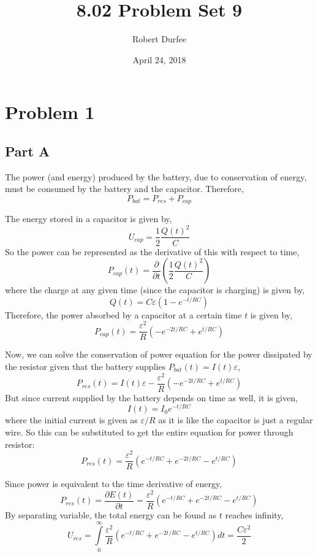 \documentclass{article}
\title{8.02 Problem Set 9}
\author{Robert Durfee}
\date{April 24, 2018}
\begin{document}
\maketitle

\section{Problem 1}

\subsection*{Part A}

The power (and energy) produced by the battery, due to conservation of energy,
must be consumed by the battery and the capacitor. Therefore,
$$ P_{bat} = P_{res} + P_{cap} $$

The energy stored in a capacitor is given by,
$$ U_{cap} = \frac{1}{2} \frac{Q(t)^2}{C} $$
So the power can be represented as the derivative of this with respect to time,
$$ P_{cap}(t) = \frac{\partial}{\partial t} \left( \frac{1}{2} \frac{Q(t)^2}{C}
\right) $$
where the charge at any given time (since the capacitor is charging) is given
by,
$$ Q(t) = C \varepsilon \left(1 - e^{-t/RC} \right) $$
Therefore, the power absorbed by a capacitor at a certain time $t$ is given by,
$$ P_{cap}(t) = \frac{\varepsilon^2}{R} \left( -e^{-2t/RC} + e^{t/RC} \right) $$

Now, we can solve the conservation of power equation for the power dissipated by
the resistor given that the battery supplies $P_{bat}(t) = I(t) \varepsilon$,
$$ P_{res}(t) = I(t) \varepsilon - \frac{\varepsilon^2}{R} \left( -e^{-2t/RC} +
e^{t/RC} \right) $$
But since current supplied by the battery depends on time as well, it is given,
$$ I(t) = I_0 e^{-t/RC} $$
where the initial current is given as $\varepsilon/R$ as it is like the
capacitor is just a regular wire. So this can be substituted to get the entire
equation for power through resistor:
$$ P_{res}(t) = \frac{\varepsilon^2}{R} \left( e^{-t/RC} + e^{-2t/RC} - e^{t/RC}
\right) $$

Since power is equivalent to the time derivative of energy, 
$$ P_{res}(t) = \frac{\partial E(t)}{\partial t} = \frac{\varepsilon^2}{R} \left(
e^{-t/RC} + e^{-2t/RC} - e^{t/RC} \right) $$
By separating variable, the total energy can be found as $t$ reaches infinity,
$$ U_{res} = \int\limits_0^{\infty} \frac{\varepsilon^2}{R} \left( e^{-t/RC} +
e^{-2t/RC} - e^{t/RC} \right) dt = \frac{C \varepsilon^2}{2} $$ 
\end{document}
